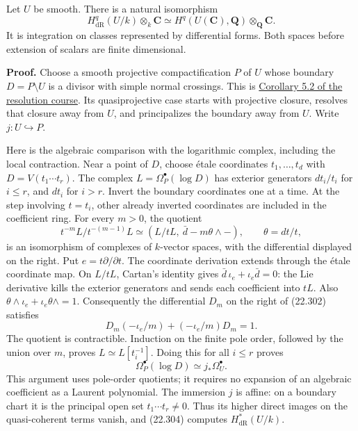 \documentclass[
  11pt,
  a4paper,
]{article}
\begin{document}
Let \(U\) be smooth. There is a natural isomorphism \[
 H^q_{\mathrm{dR}}(U/k)\otimes_k\mathbf C
       \simeq H^q(U(\mathbf C),\mathbf Q)\otimes_{\mathbf Q}\mathbf C.
 \tag{22.301}
\] It is integration on classes represented by differential forms. Both
spaces before extension of scalars are finite dimensional.

\textbf{Proof.} Choose a smooth projective compactification \(P\) of
\(U\) whose boundary \(D=P\setminus U\) is a divisor with simple normal
crossings. This is
\href{https://kokunoyumeto.github.io/open-math-courses-public/courses/resolution-of-singularities-in-characteristic-zero/principalization-and-resolution.html\#5-consequences-used-in-the-programme}{Corollary
5.2 of the resolution course}. Its quasiprojective case starts with
projective closure, resolves that closure away from \(U\), and
principalizes the boundary away from \(U\). Write
\(j:U\hookrightarrow P\).

Here is the algebraic comparison with the logarithmic complex, including
the local contraction. Near a point of \(D\), choose étale coordinates
\(t_1,\ldots,t_d\) with \(D=V(t_1\cdots t_r)\). The complex
\(L=\Omega^\bullet_P(\log D)\) has exterior generators \(dt_i/t_i\) for
\(i\le r\), and \(dt_i\) for \(i>r\). Invert the boundary coordinates
one at a time. At the step involving \(t=t_i\), other already inverted
coordinates are included in the coefficient ring. For every \(m>0\), the
quotient \[
 t^{-m}L/t^{-(m-1)}L
       \simeq (L/tL,\ \bar d-m\theta\wedge-),\qquad
 \theta=dt/t,
 \tag{22.302}
\] is an isomorphism of complexes of \(k\)-vector spaces, with the
differential displayed on the right. Put \(e=t\partial/\partial t\). The
coordinate derivation extends through the étale coordinate map. On
\(L/tL\), Cartan's identity gives \(\bar d\,\iota_e+\iota_e\bar d=0\):
the Lie derivative kills the exterior generators and sends each
coefficient into \(tL\). Also
\(\theta\wedge\iota_e+\iota_e\theta\wedge=1\). Consequently the
differential \(D_m\) on the right of (22.302) satisfies \[
 D_m(-\iota_e/m)+(-\iota_e/m)D_m=1.
 \tag{22.303}
\] The quotient is contractible. Induction on the finite pole order,
followed by the union over \(m\), proves \(L\simeq L[t_i^{-1}]\). Doing
this for all \(i\le r\) proves \[
 \Omega^\bullet_P(\log D)\simeq j_*\Omega^\bullet_U.
 \tag{22.304}
\] This argument uses pole-order quotients; it requires no expansion of
an algebraic coefficient as a Laurent polynomial. The immersion \(j\) is
affine: on a boundary chart it is the principal open set
\(t_1\cdots t_r\ne0\). Thus its higher direct images on the
quasi-coherent terms vanish, and (22.304) computes
\(H^*_{\mathrm{dR}}(U/k)\).
\end{document}
